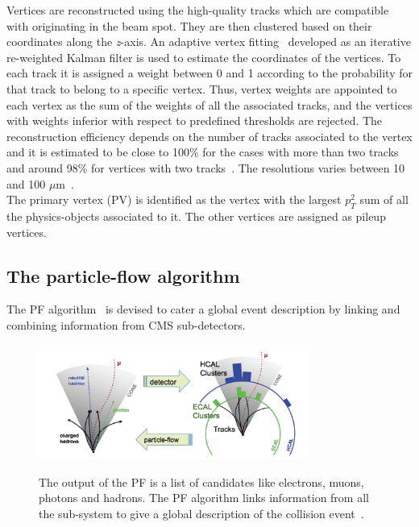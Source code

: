 Vertices are reconstructed using the high-quality tracks which are
compatible with originating in the beam spot. They are then clustered
based on their coordinates along the \emph{z}-axis. An adaptive vertex
fitting~\cite{Waltenberger_2007} developed as an iterative re-weighted Kalman filter
is used to estimate the coordinates of the vertices. To each track it is assigned a
weight between 0 and 1 according to the probability for that track to
belong to a specific vertex. Thus, vertex weights are appointed to each
vertex as the sum of the weights of all the
associated tracks, and the vertices with weights inferior with respect
to predefined
thresholds are rejected. The reconstruction efficiency depends on the
number of tracks associated to the vertex and it is estimated to
be close to 100\% for the cases with more than two tracks and around
98\% for vertices with two tracks~\cite{CMS:particleflow}. The
resolutions varies between 10 and 100 $\mu$m~\cite{CMS:particleflow}.\\
The primary vertex (PV) is identified as the vertex with the largest
$p^2_T$ sum of all the physics-objects associated to it. The other vertices are assigned as pileup
vertices.

\subsection{The particle-flow algorithm}\label{sec:PF}

The PF algorithm~\cite{CMS:particleflow} is devised to cater a global event
description by linking and combining information from CMS
sub-detectors. 
\begin{figure}[h]
\centering
\includegraphics[width=0.78\textwidth]{Figures/c2/pfscheme}\\
\caption{The output of the PF is a list of candidates like
  electrons, muons, photons and hadrons. The PF algorithm links
  information from all the sub-system to give a global description of
  the collision event~\cite{Petrucciani:2650974}.}
\label{fig:pfscheme}
\end{figure} 

